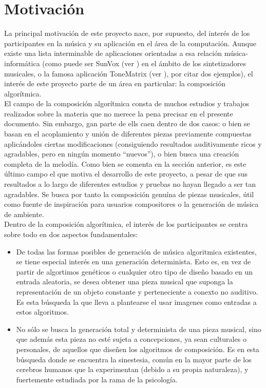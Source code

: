 \section{Motivación}


La principal motivación de este proyecto nace, por supuesto, del interés de los participantes en la música y su aplicación en el área de la computación. Aunque existe una lista interminable de aplicaciones orientadas a esa relación música-informática (como puede ser SunVox (ver \cite{SunVox}) en el ámbito de los sintetizadores musicales, o la famosa aplicación ToneMatrix (ver \cite{toneMatrix}), por citar dos ejemplos), el interés de este proyecto parte de un área en particular: la composición algorítmica.\\

El campo de la composición algorítmica consta de muchos estudios y trabajos realizados sobre la materia que no merece la pena precisar en el presente documento. Sin embargo, gan parte de ells caen dentro de dos casos: o bien se basan en el acoplamiento y unión de diferentes piezas previamente compuestas aplicándoles ciertas modificaciones (consiguiendo resultados auditivamente ricos y agradables, pero en ningún momento ``nuevos''), o bien busca una creación completa de la melodía. Como bien se comenta en la sección anterior, es este último campo el que motiva el desarrollo de este proyecto, a pesar de que sus resultados a lo largo de diferentes estudios y pruebas no hayan llegado a ser tan agradables. Se busca por tanto la composición genuína de piezas musicales, útil como fuente de inspiración para usuarios compositores o la generación de música de ambiente.\\

Dentro de la composición algorítmica, el interés de los participantes se centra sobre todo en dos aspectos fundamentales:

\begin{itemize}

	\item De todas las formas posibles de generación de música algoritmica existentes, se tiene especial interés en una generación determinista. Esto es, en vez de partir de algortimos genéticos o cualquier otro tipo de diseño basado en un entrada aleatoria, se desea obtener una pieza musical que suponga la representación de un objeto constante y perteneciente a conexto no auditivo. Es esta búsqueda la que lleva a plantearse el usar imagenes como entradas a estos algoritmos.
	
	\item No sólo se busca la generación total y determinista de una pieza musical, sino que además esta pieza no esté sujeta a concepciones, ya sean culturales o personales, de aquellos que diseñen los algoritmos de composición. Es en esta búsqueda donde se encuentra la sinestesia, común en la mayor parte de los cerebros humanos que la experimentan (debido a su propia naturaleza), y fuertemente estudiada por la rama de la psicología.
	
\end{itemize}

